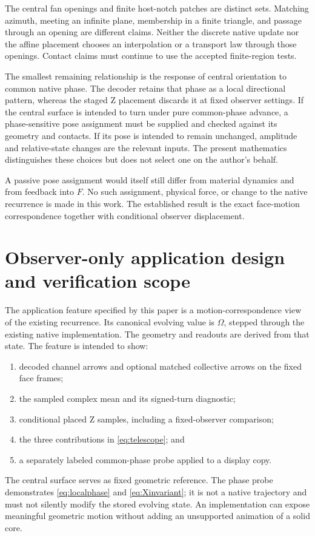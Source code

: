 \documentclass[11pt,a4paper]{article}
\numberwithin{equation}{section}
\theoremstyle{definition}
\theoremstyle{remark}
\begin{document}
The central fan openings and finite host-notch patches are distinct sets.
Matching azimuth, meeting an infinite plane, membership in a finite
triangle, and passage through an opening are different claims. Neither the
discrete native update nor the affine placement chooses an interpolation
or a transport law through those openings. Contact claims must continue to
use the accepted finite-region tests.

The smallest remaining relationship is the response of central orientation
to common native phase. The decoder retains that phase as a local directional
pattern, whereas the staged Z placement discards it at fixed observer
settings. If the central surface is intended to turn under pure common-phase
advance, a phase-sensitive pose assignment must be supplied and checked
against its geometry and contacts. If its pose is intended to remain
unchanged, amplitude and relative-state changes are the relevant inputs.
The present mathematics distinguishes these choices but does not select
one on the author's behalf.

A passive pose assignment would itself still differ from material dynamics
and from feedback into $F$. No such assignment, physical force, or change
to the native recurrence is made in this work. The established result is
the exact face-motion correspondence together with conditional observer
displacement.

\section{Observer-only application design and verification scope}
\label{sec:implementation}

The application feature specified by this paper is a motion-correspondence
view of the existing recurrence. Its canonical evolving value is $\Omega$,
stepped through the existing native implementation. The geometry and
readouts are derived from that state. The feature is intended to show:
\begin{enumerate}
\item decoded channel arrows and optional matched collective arrows on the
fixed face frames;
\item the sampled complex mean and its signed-turn diagnostic;
\item conditional placed Z samples, including a fixed-observer comparison;
\item the three contributions in \eqref{eq:telescope}; and
\item a separately labeled common-phase probe applied to a display copy.
\end{enumerate}
The central surface serves as fixed geometric reference. The phase probe
demonstrates \eqref{eq:localphase} and \eqref{eq:Xinvariant}; it is not a
native trajectory and must not silently modify the stored evolving state.
An implementation can expose meaningful geometric motion without adding
an unsupported animation of a solid core.
\end{document}
